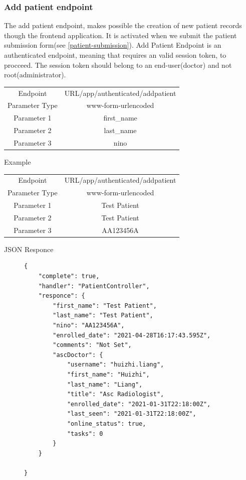 				\subsubsection{Add patient endpoint}
					The add patient endpoint, makes possible the creation of new patient records though the frontend application. It
					is activated when we submit the patient submission form(see \ref{patient-submission}). Add Patient Endpoint is an 
					authenticated endpoint, meaning that requires an valid session token, to procceed. The session token should belong
					to an end-user(doctor) and not root(administrator).
					\begin{center}
						\begin{tabular}{ |c|c| } 
							\hline
							Endpoint & {{URL}}/app/authenticated/addpatient\\
							Parameter Type & www-form-urlencoded  \\
							Parameter 1 & first\_name\\
							Parameter 2 & last\_name  \\
							Parameter 3 & nino  \\
							\hline
						\end{tabular}
					\end{center}
					Example
					\begin{center}
						\begin{tabular}{ |c|c| } 
							\hline
							Endpoint & {{URL}}/app/authenticated/addpatient\\
							Parameter Type & www-form-urlencoded  \\
							Parameter 1 & Test Patient\\
							Parameter 2 & Test Patient  \\
							Parameter 3 & AA123456A  \\
							\hline
						\end{tabular}
					\end{center}
					JSON Responce
					\begin{figure}[H]
						\iftrue
						\begin{lstlisting}[]
{
	"complete": true,
	"handler": "PatientController",
	"responce": {
		"first_name": "Test Patient",
		"last_name": "Test Patient",
		"nino": "AA123456A",
		"enrolled_date": "2021-04-28T16:17:43.595Z",
		"comments": "Not Set",
		"ascDoctor": {
			"username": "huizhi.liang",
			"first_name": "Huizhi",
			"last_name": "Liang",
			"title": "Asc Radiologist",
			"enrolled_date": "2021-01-31T22:18:00Z",
			"last_seen": "2021-01-31T22:18:00Z",
			"online_status": true,
			"tasks": 0
		}
	}
	
}
						\end{lstlisting}
					\end{figure}

